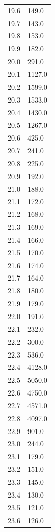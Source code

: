 \begin{minipage}{\linewidth}
\begin{table}[H]
\begin{tabular}{ll}
        19.6&		149.0 \\
        19.7&		143.0 \\
        19.8&		153.0 \\
        19.9&		182.0 \\
        20.0&		291.0 \\
        20.1&		1127.0 \\
        20.2&		1599.0 \\
        20.3&		1533.0 \\
        20.4&		1430.0 \\
        20.5&		1267.0 \\
        20.6&		425.0 \\
        20.7&		241.0 \\
        20.8&		225.0 \\
        20.9&		192.0 \\
        21.0&		188.0 \\
        21.1&		172.0 \\
        21.2&		168.0 \\
        21.3&		169.0 \\
        21.4&		166.0 \\
        21.5&		170.0 \\
        21.6&		174.0 \\
        21.7&		164.0 \\
        21.8&		180.0 \\
        21.9&		179.0 \\
        22.0&		191.0 \\
        22.1&		232.0 \\
        22.2&		300.0 \\
        22.3&		536.0 \\
        22.4&		4128.0 \\
        22.5&		5050.0 \\
        22.6&		4750.0 \\
        22.7&		4571.0 \\
        22.8&		4097.0 \\
        22.9&		901.0 \\
        23.0&		244.0 \\
        23.1&		179.0 \\
        23.2&		151.0 \\
        23.3&		145.0 \\
        23.4&		130.0 \\
        23.5&		121.0 \\
        23.6&		126.0 \\

\end{tabular}
\end{table}
\end{minipage}
